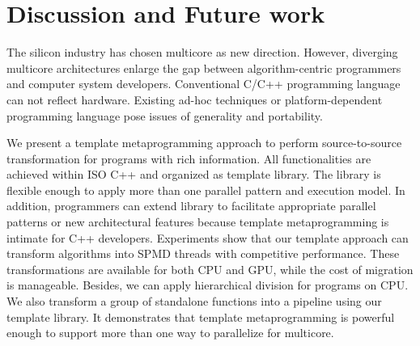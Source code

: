 \section{Discussion and Future work}\label{sec:con}
The silicon industry has chosen multicore as new
direction. However, diverging multicore architectures enlarge the gap between algorithm-centric programmers and
computer system developers.  Conventional C/C++ programming language
can not reflect hardware.  Existing ad-hoc techniques
or platform-dependent programming language pose issues of generality
and portability. 


We present a template metaprogramming approach to perform source-to-source
transformation for programs with rich information. All functionalities
are achieved within ISO C++ and organized as template library. The
library is flexible enough to
apply more than one parallel
pattern and execution model. In addition, programmers can extend library to
facilitate appropriate parallel patterns or new architectural
features because template metaprogramming is
intimate for C++ developers.  Experiments show
that our template approach can transform algorithms into SPMD threads
with competitive performance. These transformations are available for
both CPU and GPU, while the cost of migration is manageable. Besides, we
can apply hierarchical division for programs on CPU. We also
transform a group of standalone functions into a
pipeline using our template library. It demonstrates that template
metaprogramming is powerful enough to support more than one way to
parallelize for multicore.



